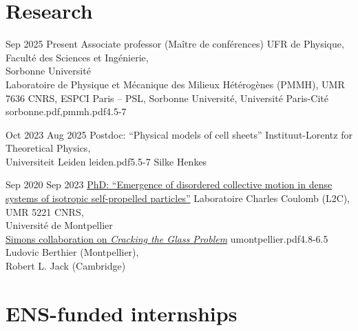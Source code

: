 \documentclass[a4paper]{cvtemplate_en} %
\begin{document}
\makeprofile %


\vspace{2mm}
\section{Research}

\begin{cvbody}

\cvitem
	{Sep 2025}
	{Present}
  {Associate professor (Ma\^itre de conf\'erences)}
  {UFR de Physique, Facult\'e des Sciences et Ing\'enierie,\\ Sorbonne Universit\'e \\ Laboratoire de Physique et M\'ecanique des Milieux H\'et\'erog\`enes (PMMH), UMR 7636 CNRS, ESPCI Paris -- PSL, Sorbonne Universit\'e, Universit\'e Paris-Cit\'e }
  {sorbonne.pdf,pmmh.pdf}{4.5}{-7}
	{}
  {\\[-20pt]}

\cvitem
	{Oct 2023}
	{Aug 2025}
  {Postdoc: ``Physical models of cell sheets''}
  {Instituut-Lorentz for Theoretical Physics,\\ Universiteit Leiden }
  {leiden.pdf}{5.5}{-7}
	{Silke Henkes}
  {\\[15pt]}

\cvitem
	{Sep 2020}
	{Sep 2023}
  {\href{https://theses.hal.science/tel-04530690v1}{PhD: ``Emergence of disordered collective motion in dense systems of isotropic self-propelled particles''}}
  {Laboratoire Charles Coulomb (L2C), UMR 5221 CNRS,\\ Universit\'e de Montpellier \\
  \href{https://scglass.uchicago.edu}{Simons collaboration on \textit{Cracking the Glass Problem}}}
  {umontpellier.pdf}{4.8}{-6.5}
	{Ludovic Berthier (Montpellier),\\ Robert L. Jack (Cambridge)}
  {\\}

\end{cvbody}

\section{ENS-funded internships}
\end{document}

